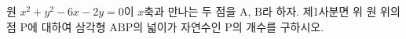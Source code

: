 원 $x^2 + y^2 - 6x - 2y = 0$이 $x$축과 만나는 두 점을 $\mathrm{A}$, $\mathrm{B}$라 하자.
제1사분면 위 원 위의 점 $\mathrm{P}$에 대하여 삼각형 $\mathrm{ABP}$의 넓이가 자연수인 $\mathrm{P}$의 개수를 구하시오.
